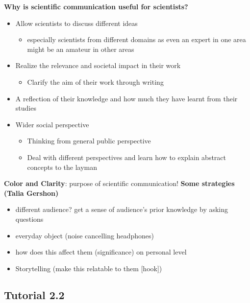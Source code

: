 \documentclass{article}
\begin{document}
\begin{multicols}{2}
\textbf{Why is scientific communication useful for scientists?}
\begin{itemize}
	\item Allow scientists to discuss different ideas
	\begin{itemize}
		\item especially scientists from different domains as even an expert in one area might be an amateur in other areas
	\end{itemize}
	\item Realize the relevance and societal impact in their work
	\begin{itemize}
		\item Clarify the aim of their work through writing
	\end{itemize}
	\item A reflection of their knowledge and how much they have learnt from their studies
	\item Wider social perspective
	\begin{itemize}
		\item Thinking from general public perspective
		\item Deal with different perspectives and learn how to explain abstract concepts to the layman\\
	\end{itemize}
\end{itemize}

\textbf{Color and Clarity}: purpose of scientific communication!
\textbf{Some strategies (Talia Gershon)}
\begin{itemize}
	\item different audience? get a sense of audience's prior knowledge by asking questions
	\item everyday object (noise cancelling headphones)
	\item how does this affect them (significance) on personal level
	\item Storytelling (make this relatable to them [hook])
\end{itemize}

\subsection{Tutorial 2.2}


\end{multicols}
\end{document}

